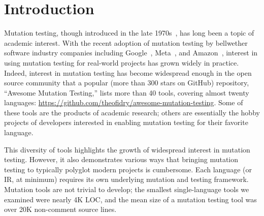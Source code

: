 \documentclass[acmsmall,screen,review,anonymous]{acmart}
\begin{document}





\maketitle

\section{Introduction}

Mutation testing, though introduced in the late
1970s~\cite{demillo1978hints,mathur2012foundations,demillo1978hints},
has long been a topic of academic interest.  With the recent adoption of mutation
testing by bellwether software industry companies including
Google~\cite{GoogleMut}, Meta~\cite{BellerFacebookMutation}, and
Amazon~\cite{AmazonMut}, interest in using mutation testing for
real-world projects has grown widely in practice. 
%
Indeed, interest in mutation testing has become widespread enough in the open
source community that a popular (more than 300 stars on GitHub)
repository, ``Awesome Mutation Testing,'' lists more than 40 tools,
covering almost twenty languages:
\url{https://github.com/theofidry/awesome-mutation-testing}.  Some of
these tools are the products of academic research; others are
essentially the hobby projects of developers interested in enabling
mutation testing for their favorite language.

This diversity of tools highlights the growth of widespread interest in mutation
testing.  However, it also demonstrates various ways that bringing mutation testing to
typically polyglot modern projects is cumbersome. Each language (or IR, at
minimum) requires its own underlying mutation and testing framework.
Mutation tools are not trivial to develop; the smallest
single-language tools we examined were nearly 4K LOC, and the mean size
of a mutation testing tool was over 20K non-comment source lines.
\end{document}
